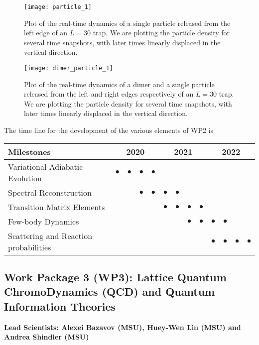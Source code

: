 \documentclass[10pt]{article}
\begin{document}
\begin{figure}[hbtp]
\centering
\texttt{[image: particle\_1]}
\caption{Plot of the real-time dynamics of a single particle released from the left edge of an $L=30$ trap.  We are plotting the particle density for several time snapshots, with later times linearly displaced in the vertical direction.}
\label{particle}
\end{figure}
 
\begin{figure}
\centering
\texttt{[image: dimer\_particle\_1]}
\caption{Plot of the real-time dynamics of a dimer and a single particle released from the left and right edges respectively of an $L=30$ trap.  We are plotting the particle density for
several time snapshots, with later times linearly displaced in the vertical
direction.}
\label{dimer_particle}
\end{figure}

 The time line for the development of the various elements of WP2 is
\begin{footnotesize}
\begin{center}
\begin{tabular}{|l|c|c|c|c|c|c|c|c|c|c|c|c|}
\hline
\multicolumn{1}{|l}{Milestones } & \multicolumn{4}{|c|}{ 2020 } & \multicolumn{4}{c|}{ 2021 } & \multicolumn{4}{c|}{ 2022 } \\
\hline
Variational Adiabatic Evolution &$\bullet$ &$\bullet$ &$\bullet$ &$\bullet$ & & & & & & & &  \\
\hline
Spectral Reconstruction & & & $\bullet$ &$\bullet$ &$\bullet$ &$\bullet$ & & & & & &  \\
\hline
Transition Matrix Elements & & & & & $\bullet$ &$\bullet$ &$\bullet$ &$\bullet$ & & & &   \\
\hline
Few-body Dynamics & & & & & & & $\bullet$ &$\bullet$ &$\bullet$ &$\bullet$ & &\\
\hline
Scattering and Reaction probabilities & & & & & & & & & $\bullet$ &$\bullet$ &$\bullet$ &$\bullet$ \\
\hline

\end{tabular}
\end{center}
\end{footnotesize}

\subsection{Work Package 3 (WP3): Lattice Quantum ChromoDynamics (QCD) and Quantum Information Theories}
{\bf Lead Scientists: Alexei Bazavov (MSU), Huey-Wen Lin (MSU) and Andrea Shindler (MSU)}
\end{document}
